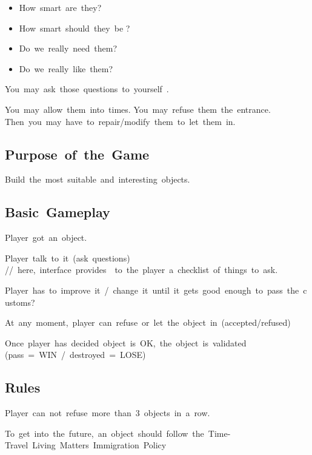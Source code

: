 \begin{itemize}
\item How~smart~are~they?~ 
\item How~smart~should~they~be ? 
\item Do~we~really~need~them? 
\item Do~we~really~like~them? 
\end{itemize}
You~may~ask~those~questions~to~yourself~.

You~may~allow~them~into~times.\newline
You~may~refuse~them~the~entrance.\newline
Then~you~may~have~to~repair/modify~them~to~let~them~in.

\subsection{Purpose~of~the~Game}

Build~the~most~suitable~and~interesting~objects.

\subsection{Basic~Gameplay}

Player~got~an~object.

Player~talk~to~it~(ask~questions)\newline
//~here,~interface~provides~~to~the~player~a~checklist~of~things~to~ask.

Player~has~to~improve~it~/~change~it~until~it~gets~good~enough~to~pass~the~customs?

At~any~moment,~player~can~refuse~or~let~the~object~in~(accepted/refused)

Once~player~has~decided~object~is~OK,~the~object~is~validated~\newline
(pass~=~WIN~/~destroyed~=~LOSE)

\subsection{Rules}

Player~can~not~refuse~more~than~3~objects~in~a~row.

To~get~into~the~future,~an~object~should~follow~the~Time-Travel~Living~Matters~Immigration~Policy~
